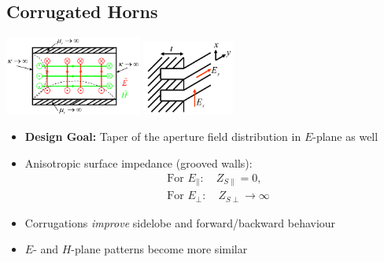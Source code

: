 \subsection{Corrugated Horns}
\includegraphics[width=4.5cm]{content/aawp/pictures/corrugated_horn_magn_walls.png}
\includegraphics[width=3cm]{content/aawp/pictures/corrugated_wall.png}
\begin{itemize}
    \itemsep0pt
    \item \textbf{Design Goal:} Taper of the aperture field distribution in $E$-plane as well
    \item Anisotropic surface impedance (grooved walls):
        \begin{align*}
            &\text{For }E_\parallel: \quad Z_{S\parallel} = 0,\\
            &\text{For }E_\perp:     \quad Z_{S\perp} \to \infty
        \end{align*}
    \item Corrugations \textit{improve} sidelobe and forward/backward behaviour
    \item $E$- and $H$-plane patterns become more similar
\end{itemize}


